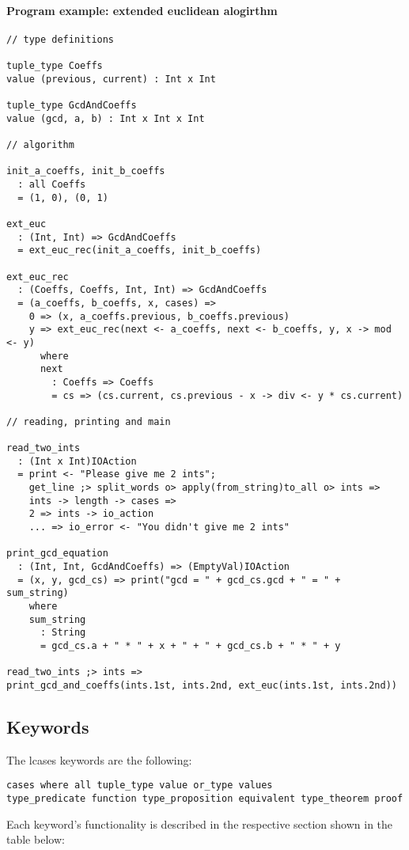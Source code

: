 \documentclass{article}
\begin{document}
\paragraph{Program example: extended euclidean alogirthm}
\begin{verbatim}
// type definitions

tuple_type Coeffs
value (previous, current) : Int x Int

tuple_type GcdAndCoeffs
value (gcd, a, b) : Int x Int x Int

// algorithm

init_a_coeffs, init_b_coeffs
  : all Coeffs
  = (1, 0), (0, 1)

ext_euc
  : (Int, Int) => GcdAndCoeffs
  = ext_euc_rec(init_a_coeffs, init_b_coeffs)

ext_euc_rec
  : (Coeffs, Coeffs, Int, Int) => GcdAndCoeffs
  = (a_coeffs, b_coeffs, x, cases) =>
    0 => (x, a_coeffs.previous, b_coeffs.previous)
    y => ext_euc_rec(next <- a_coeffs, next <- b_coeffs, y, x -> mod <- y)
      where
      next
        : Coeffs => Coeffs
        = cs => (cs.current, cs.previous - x -> div <- y * cs.current)

// reading, printing and main

read_two_ints
  : (Int x Int)IOAction
  = print <- "Please give me 2 ints";
    get_line ;> split_words o> apply(from_string)to_all o> ints =>
    ints -> length -> cases =>
    2 => ints -> io_action
    ... => io_error <- "You didn't give me 2 ints"
 
print_gcd_equation
  : (Int, Int, GcdAndCoeffs) => (EmptyVal)IOAction
  = (x, y, gcd_cs) => print("gcd = " + gcd_cs.gcd + " = " + sum_string)
    where
    sum_string
      : String
      = gcd_cs.a + " * " + x + " + " + gcd_cs.b + " * " + y

read_two_ints ;> ints =>
print_gcd_and_coeffs(ints.1st, ints.2nd, ext_euc(ints.1st, ints.2nd))
\end{verbatim}

\subsection{Keywords}

The lcases keywords are the following:
\begin{verbatim}
cases where all tuple_type value or_type values
type_predicate function type_proposition equivalent type_theorem proof
\end{verbatim}
Each keyword's functionality is described in the respective section shown in the 
table below:
\end{document}
